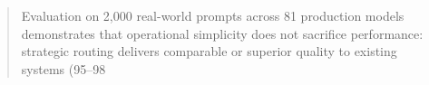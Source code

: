 \begin{abstract}
Evaluation on 2,000 real-world prompts across 81 production models demonstrates that operational simplicity does not sacrifice performance: strategic routing delivers comparable or superior quality to existing systems (95--98%
\end{abstract}

